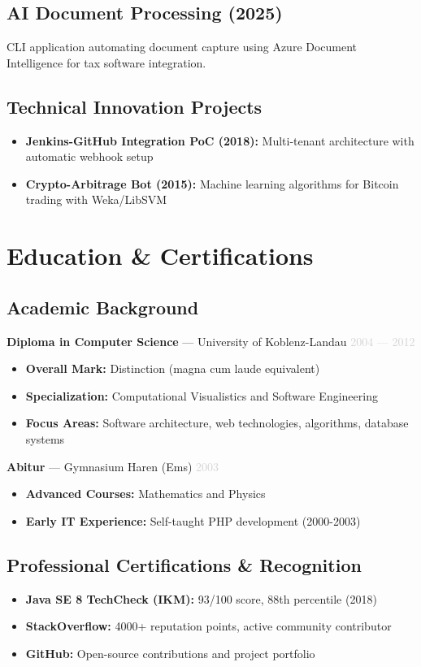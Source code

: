 \documentclass[11pt,a4paper]{article}
\begin{document}
\subsection{AI Document Processing (2025)}
CLI application automating document capture using Azure Document Intelligence for tax software integration.

\subsection{Technical Innovation Projects}
\begin{itemize}
    \item \textbf{Jenkins-GitHub Integration PoC (2018):} Multi-tenant architecture with automatic webhook setup
    \item \textbf{Crypto-Arbitrage Bot (2015):} Machine learning algorithms for Bitcoin trading with Weka/LibSVM
\end{itemize}

\newpage

\section{Education \& Certifications}

\subsection{Academic Background}
\textbf{Diploma in Computer Science} — University of Koblenz-Landau \hfill \textcolor{lightgray}{2004 — 2012}
\begin{itemize}
    \item \textbf{Overall Mark:} Distinction (magna cum laude equivalent)
    \item \textbf{Specialization:} Computational Visualistics and Software Engineering
    \item \textbf{Focus Areas:} Software architecture, web technologies, algorithms, database systems
\end{itemize}

\textbf{Abitur} — Gymnasium Haren (Ems) \hfill \textcolor{lightgray}{2003}
\begin{itemize}
    \item \textbf{Advanced Courses:} Mathematics and Physics
    \item \textbf{Early IT Experience:} Self-taught PHP development (2000-2003)
\end{itemize}

\subsection{Professional Certifications \& Recognition}
\begin{itemize}
    \item \textbf{Java SE 8 TechCheck (IKM):} 93/100 score, 88th percentile (2018)
    \item \textbf{StackOverflow:} 4000+ reputation points, active community contributor
    \item \textbf{GitHub:} Open-source contributions and project portfolio
\end{itemize}
\end{document}

